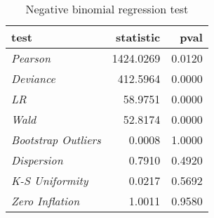 \begin{wraptable}{r}{3.5in}

\caption{\label{tab:negbin_reg_tests}Negative binomial regression test}
\centering
\fontsize{9}{11}\selectfont
\begin{tabular}[t]{>{}lrr}
\toprule
test & statistic & pval\\
\midrule
\em{Pearson} & 1424.0269 & 0.0120\\
\em{Deviance} & 412.5964 & 0.0000\\
\em{LR} & 58.9751 & 0.0000\\
\em{Wald} & 52.8174 & 0.0000\\
\em{Bootstrap Outliers} & 0.0008 & 1.0000\\
\addlinespace
\em{Dispersion} & 0.7910 & 0.4920\\
\em{K-S Uniformity} & 0.0217 & 0.5692\\
\em{Zero Inflation} & 1.0011 & 0.9580\\
\bottomrule
\end{tabular}
\end{wraptable}
